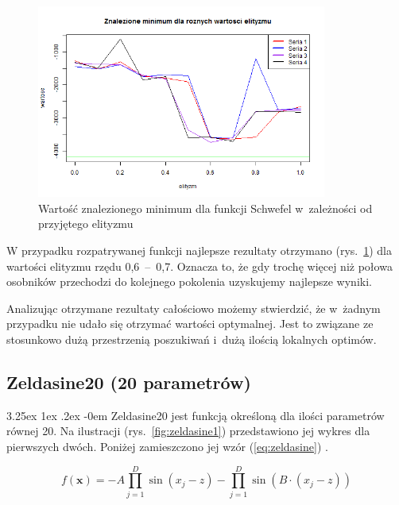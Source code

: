 \documentclass[11pt, a4paper]{article}
\makeatletter
\newcommand{\fbi}{\leavevmode{\parindent=1em\indent}}
\renewcommand\paragraph{\@startsection{paragraph}{5}{\z@}
  {3.25ex \@plus1ex \@minus.2ex}
  {-0em}
  {\normalfont\normalsize\bfseries}}
\makeatother
\begin{document}
\begin{figure}[H]
	\begin{center}
		\includegraphics[width=0.85\textwidth]{./assets/Schwefel6.png}
		\caption{Wartość znalezionego minimum dla funkcji Schwefel w~zależności od przyjętego elityzmu}
		\label{fig:schwefel6}
	\end{center}
\end{figure}

\fbi
W przypadku rozpatrywanej funkcji najlepsze rezultaty otrzymano (rys.~\ref{fig:schwefel6}) dla wartości elityzmu rzędu 0,6~--~0,7. Oznacza to, że gdy trochę więcej niż połowa osobników przechodzi do kolejnego pokolenia uzyskujemy najlepsze wyniki.

\fbi
Analizując otrzymane rezultaty całościowo możemy stwierdzić, że w~żadnym przypadku nie udało się otrzymać wartości optymalnej. Jest to związane ze stosunkowo dużą przestrzenią poszukiwań i~dużą ilością lokalnych optimów.

\newpage
\subsection{Zeldasine20 (20 parametrów)}
\paragraph{}
Zeldasine20 jest funkcją określoną dla ilości parametrów równej 20. Na ilustracji (rys.~\ref{fig:zeldasine1}) przedstawiono jej wykres dla pierwszych dwóch. Poniżej zamieszczono jej wzór (\ref{eq:zeldasine}) \cite{test4}.

\begin{equation}\label{eq:zeldasine}
f(\boldsymbol{x}) = -A \prod_{j=1}^{D} \sin (x_j - z) - \prod_{j=1}^{D} \sin (B \cdot (x_j - z))
\end{equation}
\end{document}
